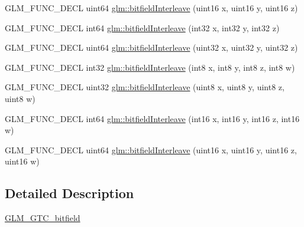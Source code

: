 \begin{DoxyCompactItemize}
\item 
G\+L\+M\+\_\+\+F\+U\+N\+C\+\_\+\+D\+E\+CL uint64 \hyperlink{group__gtc__bitfield_ga3c170e2ec54f2faab5e1c5bb693d718d}{glm\+::bitfield\+Interleave} (uint16 x, uint16 y, uint16 z)
\item 
G\+L\+M\+\_\+\+F\+U\+N\+C\+\_\+\+D\+E\+CL int64 \hyperlink{group__gtc__bitfield_ga64e2d84f6560af3cc639644b1e628c42}{glm\+::bitfield\+Interleave} (int32 x, int32 y, int32 z)
\item 
G\+L\+M\+\_\+\+F\+U\+N\+C\+\_\+\+D\+E\+CL uint64 \hyperlink{group__gtc__bitfield_ga7c10eb37f608365cfaef5ca2c476e1ce}{glm\+::bitfield\+Interleave} (uint32 x, uint32 y, uint32 z)
\item 
G\+L\+M\+\_\+\+F\+U\+N\+C\+\_\+\+D\+E\+CL int32 \hyperlink{group__gtc__bitfield_ga7da84ecc2b3a46c9c08a9f40012359cf}{glm\+::bitfield\+Interleave} (int8 x, int8 y, int8 z, int8 w)
\item 
G\+L\+M\+\_\+\+F\+U\+N\+C\+\_\+\+D\+E\+CL uint32 \hyperlink{group__gtc__bitfield_ga447c0bbed9d60c14578626d8f03f3755}{glm\+::bitfield\+Interleave} (uint8 x, uint8 y, uint8 z, uint8 w)
\item 
G\+L\+M\+\_\+\+F\+U\+N\+C\+\_\+\+D\+E\+CL int64 \hyperlink{group__gtc__bitfield_ga09ee0be0fac790a1607a711e597dd9bf}{glm\+::bitfield\+Interleave} (int16 x, int16 y, int16 z, int16 w)
\item 
G\+L\+M\+\_\+\+F\+U\+N\+C\+\_\+\+D\+E\+CL uint64 \hyperlink{group__gtc__bitfield_gac8a926a7bfd9b23c22a4f685193fbfe1}{glm\+::bitfield\+Interleave} (uint16 x, uint16 y, uint16 z, uint16 w)
\end{DoxyCompactItemize}


\subsection{Detailed Description}
\hyperlink{group__gtc__bitfield}{G\+L\+M\+\_\+\+G\+T\+C\+\_\+bitfield} 